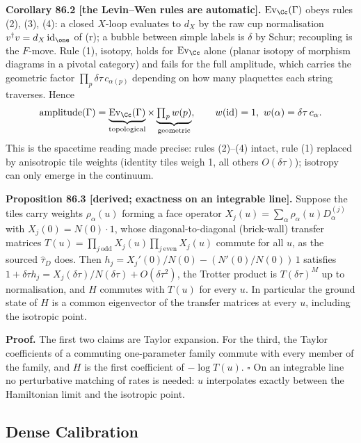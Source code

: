\textbf{Corollary 86.2 [the Levin--Wen rules are automatic].}  \(\operatorname{Ev}_{\Cc}(\Gamma)\) obeys rules (2), (3), (4): a closed
\(X\)-loop evaluates to \(d_X\) by the raw cup normalisation
\(v^\dagger v=d_X\operatorname{id}_\one\) of (r); a bubble between simple
labels is \(\delta\) by Schur; recoupling is the \(F\)-move.  Rule (1),
isotopy, holds for \(\operatorname{Ev}_{\Cc}\) alone (planar isotopy of
morphism diagrams in a pivotal category) and fails for the full amplitude,
which carries the geometric factor \(\prod_p\delta\tau\,c_{\alpha(p)}\)
depending on how many plaquettes each string traverses.  Hence
\[
  \text{amplitude}(\Gamma)=\underbrace{\operatorname{Ev}_{\Cc}(\Gamma)}_{\text{topological}}
  \times\underbrace{\textstyle\prod_p w(p)}_{\text{geometric}},
  \qquad w(\mathrm{id})=1,\ w(\alpha)=\delta\tau\,c_\alpha .
\]
This is the spacetime reading made precise: rules (2)--(4) intact, rule (1)
replaced by anisotropic tile weights (identity tiles weigh 1, all others
\(O(\delta\tau)\)); isotropy can only emerge in the continuum.

\textbf{Proposition 86.3 [derived; exactness on an integrable line].}  Suppose the tiles carry weights \(\rho_\alpha(u)\) forming a face operator
\(X_j(u)=\sum_\alpha\rho_\alpha(u)D^{(j)}_\alpha\) with \(X_j(0)=N(0)\cdot 1\),
whose diagonal-to-diagonal (brick-wall) transfer matrices
\(T(u)=\prod_{j\ \mathrm{odd}}X_j(u)\prod_{j\ \mathrm{even}}X_j(u)\) commute for
all \(u\), as the sourced \(\hat\tau_D\) does.  Then
\(h_j=X_j'(0)/N(0)-(N'(0)/N(0))\,1\) satisfies
\(1+\delta\tau h_j=X_j(\delta\tau)/N(\delta\tau)+O(\delta\tau^2)\), the
Trotter product is \(T(\delta\tau)^M\) up to normalisation, and \(H\)
commutes with \(T(u)\) for every \(u\).  In particular the ground state of
\(H\) is a common eigenvector of the transfer matrices at every \(u\),
including the isotropic point.

\textbf{Proof.}  The first two claims are Taylor expansion.  For the third, the Taylor
coefficients of a commuting one-parameter family commute with every member
of the family, and \(H\) is the first coefficient of \(-\log T(u)\).  \(\square\)
On an integrable line no perturbative matching of rates is needed: \(u\)
interpolates exactly between the Hamiltonian limit and the isotropic point.

\subsection{Dense Calibration}

